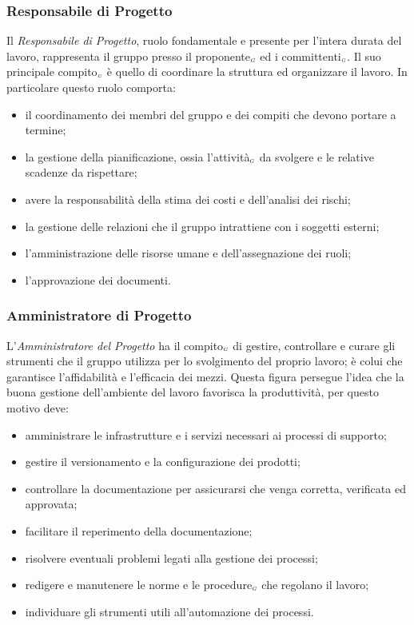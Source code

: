 \subsubsection{Responsabile di Progetto}\label{ProcessiOrganizzativiProcessoDiPianificazioneRuoliDiProgettoResponsabileDiProgetto}

Il \textit{Responsabile di Progetto}, ruolo fondamentale e presente per l'intera durata del lavoro, rappresenta il gruppo presso il proponente$_{\scaleto{G}{3pt}}$ ed i committenti$_{\scaleto{G}{3pt}}$. Il suo principale compito$_{\scaleto{G}{3pt}}$ è quello di coordinare la struttura ed organizzare il lavoro. In particolare questo ruolo comporta:
\begin{itemize}
	\item il coordinamento dei membri del gruppo e dei compiti che devono portare a termine;
	\item la gestione della pianificazione, ossia l'attività$_{\scaleto{G}{3pt}}$ da svolgere e le relative scadenze da rispettare;
	\item avere la responsabilità della stima dei costi e dell'analisi dei rischi;
	\item la gestione delle relazioni che il gruppo intrattiene con i soggetti esterni;
	\item l'amministrazione delle risorse umane e dell'assegnazione dei ruoli;
	\item l'approvazione dei documenti.
\end{itemize}

\subsubsection{Amministratore di Progetto}\label{ProcessiOrganizzativiProcessoDiPianificazioneRuoliDiProgettoAmministratoreDiProgetto}

L'\textit{Amministratore del Progetto} ha il compito$_{\scaleto{G}{3pt}}$ di gestire, controllare e curare gli strumenti che il gruppo utilizza per lo svolgimento del proprio lavoro; è colui che garantisce l'affidabilità e l'efficacia dei mezzi. Questa figura persegue l'idea che la buona gestione dell'ambiente del lavoro favorisca la produttività, per questo motivo deve:
\begin{itemize}
	\item amministrare le infrastrutture e i servizi necessari ai processi di supporto;
	\item gestire il versionamento e la configurazione dei prodotti;
	\item controllare la documentazione per assicurarsi che venga corretta, verificata ed approvata;
	\item facilitare il reperimento della documentazione;
	\item risolvere eventuali problemi legati alla gestione dei processi;
	\item redigere e manutenere le norme e le procedure$_{\scaleto{G}{3pt}}$ che regolano il lavoro;
	\item individuare gli strumenti utili all'automazione dei processi.
\end{itemize}

